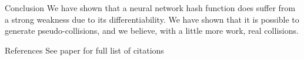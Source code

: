 \documentclass[final]{beamer}
\newlength{\onecolwid}
\begin{document}
\begin{frame}[t]
\begin{columns}[t]
\begin{column}{\onecolwid}
\begin{block}{Conclusion}
    We have shown that a neural network hash function does suffer from a strong
    weakness due to its differentiability. We have shown that it is possible
    to generate pseudo-collisions, and we believe, with a little more work,
    real collisions.
\end{block}






\begin{block}{References}
    \tiny{See paper for full list of citations}
\small{
\vspace{0.75in}}

\end{block}






\end{column}
\end{columns}
\end{frame}
\end{document}
